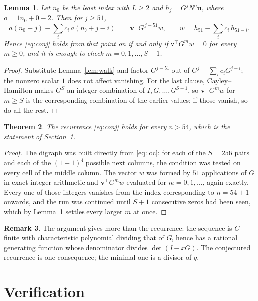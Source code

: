 \documentclass[11pt,a4paper]{article}
\theoremstyle{plain}
\newtheorem{theorem}{Theorem}
\newtheorem{lemma}[theorem]{Lemma}
\theoremstyle{definition}
\newtheorem{remark}[theorem]{Remark}
\begin{document}
\begin{lemma}\label{lem:crit}
Let $n_0$ be the least index with $L\ge2$ and $h_j=G^{j}N^{o}\mathbf{u}$, where
$o=1n_0+0-2$. Then for $j\ge51$,
\[
a(n_0+j)-\sum_i c_i\,a(n_0+j-i)\;=\;\,\mathbf{v}^{\!\top}G^{\,j-51}w,
\qquad w=h_{51}-\sum_i c_i\,h_{51-i} .
\]
Hence \eqref{eq:conj} holds from that point on if and only if
$\mathbf{v}^{\!\top}G^{m}w=0$ for every $m\ge0$, and it is enough to check
$m=0,1,\dots,S-1$.
\end{lemma}

\begin{proof}
Substitute Lemma~\ref{lem:walk} and factor $G^{j-51}$ out of
$G^{j}-\sum_ic_iG^{j-i}$; the nonzero scalar $1$ does not affect
vanishing. For the last clause, Cayley--Hamilton makes $G^{S}$ an integer combination of
$I,G,\dots,G^{S-1}$, so $\mathbf{v}^{\!\top}G^{m}w$ for $m\ge S$ is the corresponding
combination of the earlier values; if those vanish, so do all the rest.
\end{proof}

\begin{theorem}
The recurrence \eqref{eq:conj} holds for every $n>54$, which is the statement of
Section~1.
\end{theorem}

\begin{proof}
The digraph was built directly from \eqref{eq:loc}: for each of the $S=256$ pairs and each
of the $(1+1)^{4}$ possible next columns, the condition was tested on every cell of
the middle column. The vector $w$ was formed by $51$ applications of $G$ in exact integer
arithmetic and $\mathbf{v}^{\!\top}G^{m}w$ evaluated for $m=0,1,\dots$, again exactly.
Every one of those integers vanishes from the index corresponding to $n=54+1$ onwards,
and the run was continued until $S+1$ consecutive zeros had been seen, which by
Lemma~\ref{lem:crit} settles every larger $m$ at once.
\end{proof}

\begin{remark}
The argument gives more than the recurrence: the sequence is $C$-finite with characteristic
polynomial dividing that of $G$, hence has a rational generating function whose denominator
divides $\det(I-xG)$. The conjectured recurrence is one consequence; the minimal one is a
divisor of $q$.
\end{remark}

\section{Verification}
\end{document}
